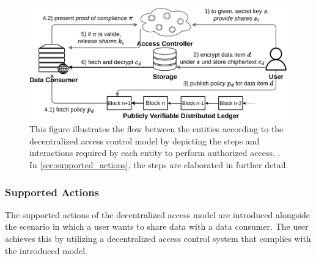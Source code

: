 \documentclass[conference]{IEEEtran}
\begin{document}
\begin{figure}[htbp]
  \centering
  \includegraphics[width=\linewidth]{figures/decentralized_access_control.pdf}
  \caption{
    This figure illustrates the flow between the entities according to the decentralized access control model by depicting the steps and interactions required by each entity to perform authorized access. \cite{ernstberger_sok_2023}.
    In \autoref{sec:supported_actions}, the steps are elaborated in further detail.
  }
  \label{fig:decentralized_access_control}
\end{figure}

\subsubsection{Supported Actions}
\label{sec:supported_actions}
The supported actions of the decentralized access model are introduced alongside the scenario in which a user wants to share data with a data consumer.
The user achieves this by utilizing a decentralized access control system that complies with the introduced model.
\end{document}
